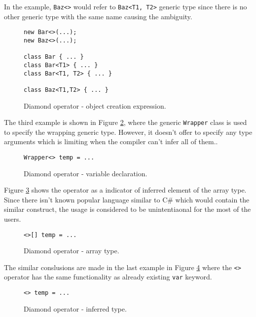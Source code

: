 In the example, \texttt{Baz<>} would refer to \texttt{Baz<T1, T2>} generic type since there is no other generic type with the same name causing the ambiguity.
\begin{figure}[h]
\begin{lstlisting}[style=csharp]
new Bar<>(...);
new Baz<>(...);

class Bar { ... }
class Bar<T1> { ... }
class Bar<T1, T2> { ... }

class Baz<T1,T2> { ... }
\end{lstlisting}
\caption{Diamond operator - object creation expression.}
\label{img41:opDi2}
\end{figure}
\par
The third example is shown in Figure \ref{img42:opDi3}, where the generic \texttt{Wrapper} class is used to specify the wrapping generic type.
However, it doesn't offer to specify any type arguments which is limiting when the compiler can't infer all of them..
\begin{figure}[h]
\begin{lstlisting}[style=csharp]
Wrapper<> temp = ...
\end{lstlisting}
\caption{Diamond operator - variable declaration.}
\label{img42:opDi3}
\end{figure}
\par
Figure \ref{img43:opDi4} shows the operator as a indicator of inferred element of the array type.
Since there isn't known popular language similar to C\# which would contain the similar construct, the usage is considered to be unintentiaonal for the most of the users.
\begin{figure}[h]
\begin{lstlisting}[style=csharp]
<>[] temp = ...
\end{lstlisting}
\caption{Diamond operator - array type.}
\label{img43:opDi4}
\end{figure}
\par
The similar conslusions are made in the last example in Figure \ref{img44:opDi5} where the \texttt{<>} operator has the same functionality as already existing \texttt{var} keyword.
\begin{figure}[h!]
\begin{lstlisting}[style=csharp]
<> temp = ...
\end{lstlisting}
\caption{Diamond operator - inferred type.}
\label{img44:opDi5}
\end{figure}

